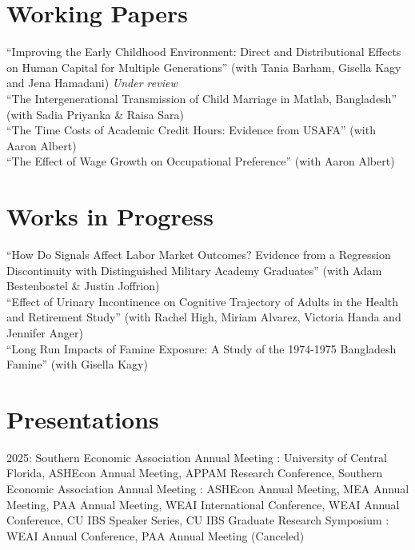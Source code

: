 \documentclass[letterpaper]{article}
\begin{document}
\section*{Working Papers}
``Improving the Early Childhood Environment: Direct and Distributional Effects on Human Capital for Multiple Generations'' (with Tania Barham, Gisella Kagy and Jena Hamadani) \textit{Under review}
\\[.5em]
``The Intergenerational Transmission of Child Marriage in Matlab, Bangladesh'' (with Sadia Priyanka \& Raisa Sara)
\\[.5em]
``The Time Costs of Academic Credit Hours: Evidence from USAFA'' (with Aaron Albert)
\\[.5em]
``The Effect of Wage Growth on Occupational Preference'' (with Aaron Albert)

\section*{Works in Progress}
``How Do Signals Affect Labor Market Outcomes? Evidence from a Regression Discontinuity with Distinguished Military Academy Graduates'' (with Adam Bestenbostel \& Justin Joffrion)
\\[.5em]
``Effect of Urinary Incontinence on Cognitive Trajectory of Adults in the Health and Retirement Study'' (with Rachel High, Miriam Alvarez, Victoria Handa and Jennifer Anger)
\\[.5em]
``Long Run Impacts of Famine Exposure: A Study of the 1974-1975 Bangladesh Famine'' (with Gisella Kagy)

\section*{Presentations}
2025: Southern Economic Association Annual Meeting
\newline{}: University of Central Florida, ASHEcon Annual Meeting, APPAM Research Conference, Southern Economic Association Annual Meeting
\newline{}: ASHEcon Annual Meeting, MEA Annual Meeting, PAA Annual Meeting, WEAI International Conference, WEAI Annual Conference, CU IBS Speaker Series, CU IBS Graduate Research Symposium
\newline{}: WEAI Annual Conference, PAA Annual Meeting (Canceled)
\end{document}

